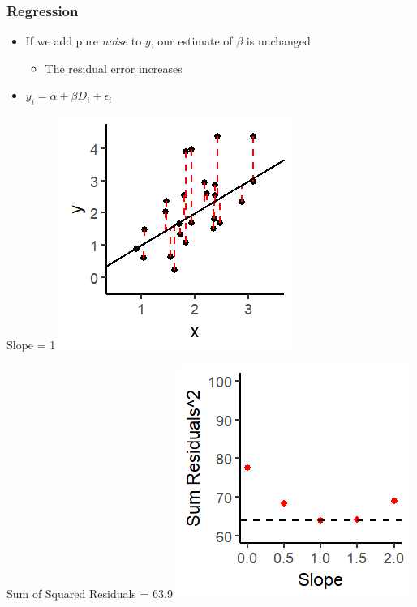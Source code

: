 \documentclass[xcolor=x11names,compress]{beamer}\usepackage[]{graphicx}\usepackage[]{color}
\makeatletter
\def\maxwidth{ %
  \ifdim\Gin@nat@width>\linewidth
    \linewidth
  \else
    \Gin@nat@width
  \fi
}
\newenvironment{knitrout}{}{} %
\renewcommand{\(}{\begin{columns}}
\renewcommand{\)}{\end{columns}}
\newcommand{\<}[1]{\begin{column}{#1}}
\renewcommand{\>}{\end{column}}
\makeatother
\begin{document}
\begin{frame}
\frametitle{Regression}
\begin{itemize}
\item If we add pure \textit{noise} to $y$, our estimate of $\beta$ is unchanged
\begin{itemize}
\item The residual error increases
\end{itemize}
\item $y_i = \alpha + \beta D_i + \epsilon_i$
\end{itemize}
\begin{multicols}{2}
Slope = 1
\begin{knitrout}
\color{fgcolor}
\includegraphics[width=\maxwidth]{figure/graph_ols7-1} 

\end{knitrout}
\columnbreak
Sum of Squared Residuals = 63.9
\begin{knitrout}
\color{fgcolor}
\includegraphics[width=\maxwidth]{figure/graph_ssr7-1} 

\end{knitrout}
\end{multicols}
\end{frame}
\end{document}
